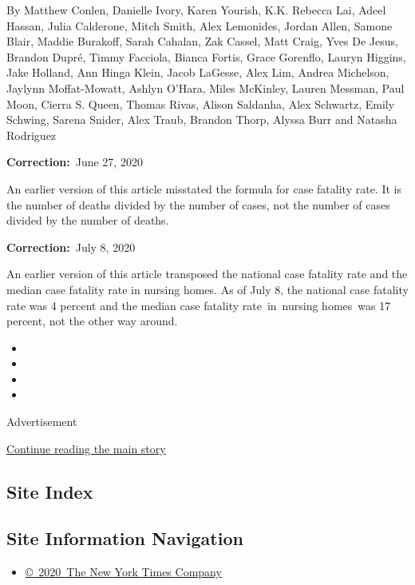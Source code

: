 By Matthew Conlen, Danielle Ivory, Karen Yourish, K.K. Rebecca Lai,
Adeel Hassan, Julia Calderone, Mitch Smith, Alex Lemonides, Jordan
Allen, Samone Blair, Maddie Burakoff, Sarah Cahalan, Zak Cassel, Matt
Craig, Yves De Jesus, Brandon Dupré, Timmy Facciola, Bianca Fortis,
Grace Gorenflo, Lauryn Higgins, Jake Holland, Ann Hinga Klein, Jacob
LaGesse, Alex Lim, Andrea Michelson, Jaylynn Moffat-Mowatt, Ashlyn
O'Hara, Miles McKinley, Lauren Messman, Paul Moon, Cierra S. Queen,
Thomas Rivas, Alison Saldanha, Alex Schwartz, Emily Schwing, Sarena
Snider, Alex Traub, Brandon Thorp, Alyssa Burr and Natasha Rodriguez

\textbf{Correction:}~June 27, 2020

An earlier version of this article misstated the formula for case
fatality rate. It is the number of deaths divided by the number of
cases, not the number of cases divided by the number of deaths.

\textbf{Correction:}~July 8, 2020

An earlier version of this article transposed the national case fatality
rate and the median case fatality rate in nursing homes. As of July 8,
the national case fatality rate was 4 percent and the median case
fatality rate~in~nursing homes~was 17 percent, not the other way around.

\begin{itemize}
\item
\item
\item
\item
\end{itemize}

Advertisement

\protect\hyperlink{after-bottom}{Continue reading the main story}

\hypertarget{site-index}{%
\subsection{Site Index}\label{site-index}}

\hypertarget{site-information-navigation}{%
\subsection{Site Information
Navigation}\label{site-information-navigation}}

\begin{itemize}
\tightlist
\item
  \href{https://help.nytimes.com/hc/en-us/articles/115014792127-Copyright-notice}{©~2020~The
  New York Times Company}
\end{itemize}

